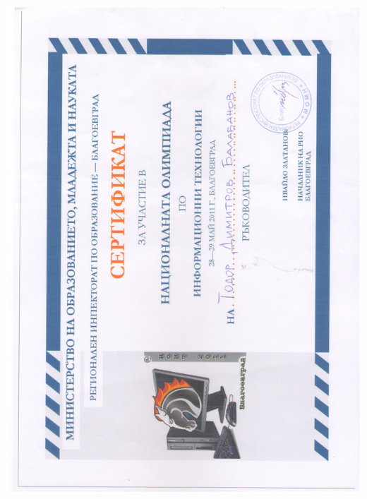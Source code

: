 \documentclass[english,a4paper]{europasscv}
\begin{document}
\includegraphics[width=\textwidth,height=\textheight,keepaspectratio]{ElSys2011}
\end{document}
